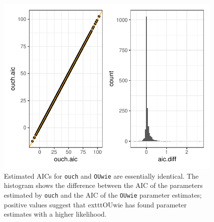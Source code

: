 \documentclass[12pt,reqno,final]{amsart}\usepackage[]{graphicx}\usepackage[]{color}
\makeatletter
\def\maxwidth{ %
  \ifdim\Gin@nat@width>\linewidth
    \linewidth
  \else
    \Gin@nat@width
  \fi
}
\newenvironment{knitrout}{}{} %
\theoremstyle{plain}
\numberwithin{equation}{part}
\makeatother
\begin{document}
\begin{knitrout}
\color{fgcolor}\begin{figure}
\includegraphics[width=\maxwidth]{figure/unnamed-chunk-3-1} \caption{Estimated AICs for \texttt{ouch} and \texttt{OUwie} are essentially identical. The histogram shows the difference between the AIC of the parameters estimated by \texttt{ouch} and the AIC of the \texttt{OUwie} parameter estimates; positive values suggest that 	exttt{OUwie} has found parameter estimates with a higher likelihood.}\label{fig:unnamed-chunk-3}
\end{figure}


\end{knitrout}

\newpage
\end{document}
